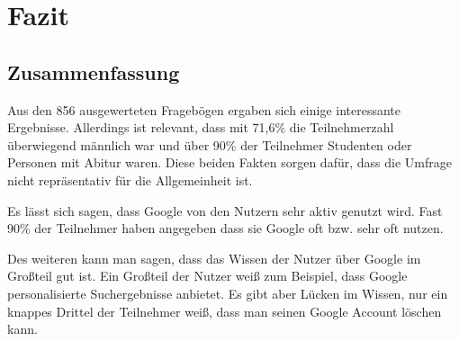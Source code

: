 %
% 

\chapter{Fazit}


\section{Zusammenfassung}
Aus den 856 ausgewerteten Fragebögen ergaben sich einige interessante Ergebnisse. Allerdings ist relevant, dass mit 71,6\% die Teilnehmerzahl überwiegend männlich war und über 90\% der Teilnehmer Studenten oder Personen mit Abitur waren. Diese beiden Fakten sorgen dafür, dass die Umfrage nicht repräsentativ für die Allgemeinheit ist.

Es lässt sich sagen, dass Google von den Nutzern sehr aktiv genutzt wird. Fast 90\% der Teilnehmer haben angegeben dass sie Google oft bzw. sehr oft nutzen.

Des weiteren kann man sagen, dass das Wissen der Nutzer über Google im Großteil gut ist. Ein Großteil der Nutzer weiß zum Beispiel, dass Google personalisierte Suchergebnisse anbietet. Es gibt aber Lücken im Wissen, nur ein knappes Drittel der Teilnehmer weiß, dass man seinen Google Account löschen kann.


